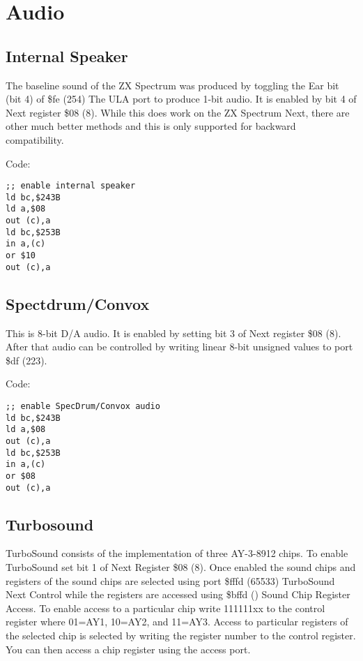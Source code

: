 \chapter{Audio}
\section{Internal Speaker}

The baseline sound of the ZX Spectrum was produced by toggling the Ear
bit (bit 4) of \$fe (254) The ULA port to produce 1-bit audio.  It is
enabled by bit 4 of Next register \$08 (8).  While this does work on
the ZX Spectrum Next, there are other much better methods and this is
only supported for backward compatibility.

Code:
\begin{verbatim}
;; enable internal speaker
ld bc,$243B
ld a,$08
out (c),a
ld bc,$253B
in a,(c)
or $10
out (c),a
\end{verbatim}

\section{Spectdrum/Convox}

This is 8-bit D/A audio.  It is enabled by setting bit 3 of Next
register \$08 (8).  After that audio can be controlled by writing
linear 8-bit unsigned values to port \$df (223).

Code:
\begin{verbatim}
;; enable SpecDrum/Convox audio
ld bc,$243B
ld a,$08
out (c),a
ld bc,$253B
in a,(c)
or $08
out (c),a
\end{verbatim}

\section{Turbosound}

TurboSound consists of the implementation of three AY-3-8912 chips. To
enable TurboSound set bit 1 of Next Register \$08 (8). Once enabled
the sound chips and registers of the sound chips are selected using
port \$fffd (65533) TurboSound Next Control while the registers are
accessed using \$bffd () Sound Chip Register Access.  To enable access
to a particular chip write 111111xx to the control register where
01=AY1, 10=AY2, and 11=AY3.  Access to particular registers of the
selected chip is selected by writing the register number to the
control register. You can then access a chip register using the access
port.

